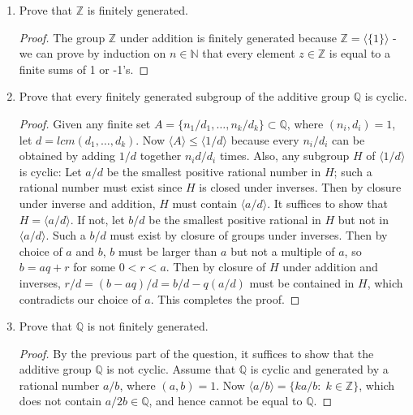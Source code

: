 \documentclass{article}
\begin{document}
\begin{enumerate}
\begin{enumerate}
\begin{enumerate}
          \item Prove that $\mathbb{Z}$ is finitely generated.
            \begin{proof}
              The group $\mathbb{Z}$ under addition is finitely generated
              because $\mathbb{Z}=\langle\{1\}\rangle$ - we can prove by
              induction on $n\in\mathbb{N}$ that every element
              $z\in\mathbb{Z}$ is equal to a finite sums of 1 or -1's.
            \end{proof}

          \item Prove that every finitely generated subgroup of the
            additive group $\mathbb{Q}$ is cyclic.
            \begin{proof}
              Given any finite set
              $A=\{n_1/d_1,\ldots,n_k/d_k\}\subset\mathbb{Q}$, where
              $(n_i,d_i)=1$, let $d=lcm(d_1,\ldots,d_k)$. Now $\langle
              A\rangle\leq\langle 1/d\rangle$ because every $n_i/d_i$ can
              be obtained by adding $1/d$ together $n_id/d_i$ times. Also,
              any subgroup $H$ of $\langle 1/d\rangle$ is cyclic: Let $a/d$
              be the smallest positive rational number in $H$; such a
              rational number must exist since $H$ is closed under
              inverses. Then by closure under inverse and addition, $H$
              must contain $\langle a/d\rangle$. It suffices to show that
              $H=\langle a/d\rangle$. If not, let $b/d$ be the smallest
              positive rational in $H$ but not in $\langle a/d\rangle$.
              Such a $b/d$ must exist by closure of groups under inverses.
              Then by choice of $a$ and $b$, $b$ must be larger than $a$
              but not a multiple of $a$, so $b=aq+r$ for some $0<r<a$. Then
              by closure of $H$ under addition and inverses,
              $r/d=(b-aq)/d=b/d-q(a/d)$ must be contained in $H$, which
              contradicts our choice of $a$. This completes the proof.
            \end{proof}

          \item Prove that $\mathbb{Q}$ is not finitely generated.
            \begin{proof}
              By the previous part of the question, it suffices to show
              that the additive group $\mathbb{Q}$ is not cyclic. Assume
              that $\mathbb{Q}$ is cyclic and generated by a rational
              number $a/b$, where $(a,b)=1$. Now $\langle
              a/b\rangle=\{ka/b:\; k\in\mathbb{Z}\}$, which does not
              contain $a/2b\in\mathbb{Q}$, and hence cannot be equal to
              $\mathbb{Q}$.
            \end{proof}
        \end{enumerate}
    \end{enumerate}


\end{enumerate}
\end{document}
